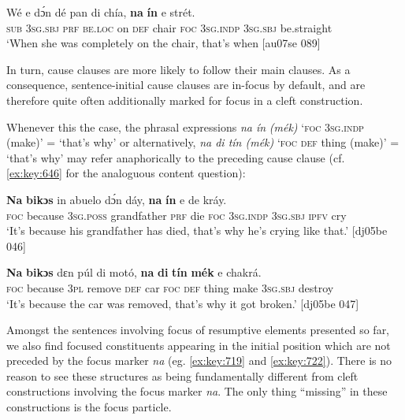 \ea%
    \label{ex:key:723}
    \gll Wé  e    dɔ́n  dé    pan  di  chía,  \textbf{na}  \textbf{ín}    e    strét.\\
\textsc{sub}  \textsc{3sg.sbj}  \textsc{prf}  \textsc{be.loc}  on  \textsc{def}  chair  \textsc{foc}  \textsc{3sg.indp}  \textsc{3sg.sbj}  be.straight\\

\glt ‘When she was completely on the chair, that’s when 
[au07se 089]
\z

In turn, cause clauses are more likely to follow their main clauses. As a consequence, sentence-initial cause clauses are in-focus by default, and are therefore quite often additionally marked for focus in a cleft construction. 


Whenever this the case, the phrasal expressions \textit{na ín} \textit{(mék)} ‘\textsc{foc} \textsc{3sg.indp} (make)’ = ‘that’s why’  or alternatively, \textit{na di tín (mék)} ‘\textsc{foc} \textsc{def} thing (make)’ = ‘that’s why’  may refer anaphorically to the preceding cause clause (cf. \ref{ex:key:646} for the analoguous content question):



\ea%
    \label{ex:key:724}
    \gll \textbf{Na}  \textbf{bikɔs}  in    abuelo    dɔ́n  dáy,  
\textbf{na}  \textbf{ín}    e    de  kráy.\\
\textsc{foc}  because  \textsc{3sg.poss}  grandfather  \textsc{prf}  die 
\textsc{foc}  \textsc{3sg.indp}  \textsc{3sg.sbj}  \textsc{ipfv} cry\\

\glt ‘It’s because his grandfather has died, that’s why he’s crying like that.’ [dj05be 046]
\z


\ea%
    \label{ex:key:725}
    \gll \textbf{Na}  \textbf{bikɔs}  dɛn  púl    di  motó,  \textbf{na}  \textbf{di}  \textbf{tín}
\textbf{mék}    e    chakrá.\\
\textsc{foc}  because  \textsc{3pl}  remove  \textsc{def}  car    \textsc{foc}  \textsc{def}  thing
make  \textsc{3sg.sbj}  destroy\\

\glt ‘It’s because the car was removed, that’s why it got broken.’ [dj05be 047]
\z

Amongst the sentences involving focus of resumptive elements presented so far, we also find focused constituents appearing in the initial position which are not preceded by the focus marker \textit{na} (eg. \ref{ex:key:719} and \ref{ex:key:722}). There is no reason to see these structures as being fundamentally different from cleft constructions involving the focus marker \textit{na}. The only thing “missing” in these constructions is the focus particle.

